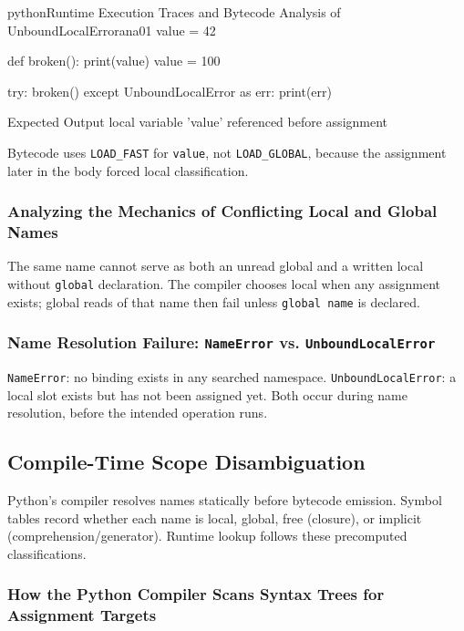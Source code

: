 \documentclass[a4paper,twoside]{report}
\begin{document}
\begin{codebox}[]{python}{Runtime Execution Traces and Bytecode Analysis of UnboundLocalError}{ana01}
value = 42

def broken():
    print(value)
    value = 100

try:
    broken()
except UnboundLocalError as err:
    print(err)
\end{codebox}


\begin{iobox}{Expected Output}
local variable 'value' referenced before assignment \\
\end{iobox}




Bytecode uses \texttt{LOAD\_FAST} for \texttt{value}, not \texttt{LOAD\_GLOBAL}, because the assignment later in the body forced local classification.

\subsubsection{Analyzing the Mechanics of Conflicting Local and Global Names}

The same name cannot serve as both an unread global and a written local without \texttt{global} declaration. The compiler chooses local when any assignment exists; global reads of that name then fail unless \texttt{global name} is declared.

\subsubsection{Name Resolution Failure: \texttt{NameError} vs. \texttt{UnboundLocalError}}

\texttt{NameError}: no binding exists in any searched namespace. \texttt{UnboundLocalError}: a local slot exists but has not been assigned yet. Both occur during name resolution, before the intended operation runs.


\subsection{Compile-Time Scope Disambiguation}

Python's compiler resolves names statically before bytecode emission. Symbol tables record whether each name is local, global, free (closure), or implicit (comprehension/generator). Runtime lookup follows these precomputed classifications.

\subsubsection{How the Python Compiler Scans Syntax Trees for Assignment Targets}
\end{document}
